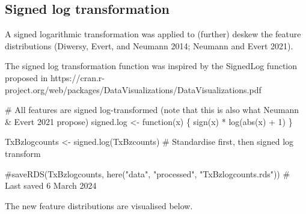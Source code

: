 \documentclass[
  letterpaper,
  DIV=11,
  numbers=noendperiod]{scrreprt}
\newenvironment{Shaded}{\begin{snugshade}}{\end{snugshade}}
\newcommand{\CommentTok}[1]{\textcolor[rgb]{0.37,0.37,0.37}{#1}}
\newcommand{\ControlFlowTok}[1]{\textcolor[rgb]{0.00,0.23,0.31}{#1}}
\newcommand{\DecValTok}[1]{\textcolor[rgb]{0.68,0.00,0.00}{#1}}
\newcommand{\FunctionTok}[1]{\textcolor[rgb]{0.28,0.35,0.67}{#1}}
\newcommand{\NormalTok}[1]{\textcolor[rgb]{0.00,0.23,0.31}{#1}}
\newcommand{\OtherTok}[1]{\textcolor[rgb]{0.00,0.23,0.31}{#1}}
\newcommand{\SpecialCharTok}[1]{\textcolor[rgb]{0.37,0.37,0.37}{#1}}
\begin{document}
\subsection{Signed log transformation}\label{signed-log-transformation}

A signed logarithmic transformation was applied to (further) deskew the
feature distributions (Diwersy, Evert, and Neumann 2014; Neumann and
Evert 2021).

The signed log transformation function was inspired by the SignedLog
function proposed in
https://cran.r-project.org/web/packages/DataVisualizations/DataVisualizations.pdf

\begin{Shaded}
\begin{Highlighting}[]
\CommentTok{\# All features are signed log{-}transformed (note that this is also what Neumann \& Evert 2021 propose)}
\NormalTok{signed.log }\OtherTok{\textless{}{-}} \ControlFlowTok{function}\NormalTok{(x) \{}
  \FunctionTok{sign}\NormalTok{(x) }\SpecialCharTok{*} \FunctionTok{log}\NormalTok{(}\FunctionTok{abs}\NormalTok{(x) }\SpecialCharTok{+} \DecValTok{1}\NormalTok{)}
\NormalTok{  \}}

\NormalTok{TxBzlogcounts }\OtherTok{\textless{}{-}} \FunctionTok{signed.log}\NormalTok{(TxBzcounts) }\CommentTok{\# Standardise first, then signed log transform}

\CommentTok{\#saveRDS(TxBzlogcounts, here("data", "processed", "TxBzlogcounts.rds")) \# Last saved 6 March 2024}
\end{Highlighting}
\end{Shaded}

The new feature distributions are visualised below.
\end{document}
